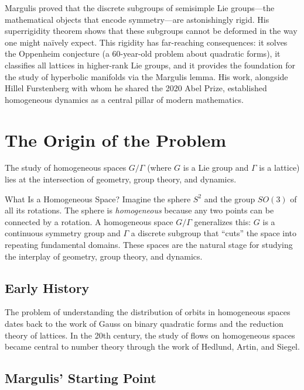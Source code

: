 Margulis proved that the discrete subgroups of semisimple Lie groups---the mathematical objects that encode symmetry---are astonishingly rigid. His superrigidity theorem shows that these subgroups cannot be deformed in the way one might na\"ively expect. This rigidity has far-reaching consequences: it solves the Oppenheim conjecture (a 60-year-old problem about quadratic forms), it classifies all lattices in higher-rank Lie groups, and it provides the foundation for the study of hyperbolic manifolds via the Margulis lemma. His work, alongside Hillel Furstenberg with whom he shared the 2020 Abel Prize, established homogeneous dynamics as a central pillar of modern mathematics.

\section{The Origin of the Problem}

The study of homogeneous spaces $G/\Gamma$ (where $G$ is a Lie group and $\Gamma$ is a lattice) lies at the intersection of geometry, group theory, and dynamics.

\begin{knowledgebridge}{What Is a Homogeneous Space?}
Imagine the sphere $S^2$ and the group $SO(3)$ of all its rotations. The sphere is \emph{homogeneous} because any two points can be connected by a rotation. A homogeneous space $G/\Gamma$ generalizes this: $G$ is a continuous symmetry group and $\Gamma$ a discrete subgroup that ``cuts'' the space into repeating fundamental domains. These spaces are the natural stage for studying the interplay of geometry, group theory, and dynamics.
\end{knowledgebridge}

\subsection{Early History}

The problem of understanding the distribution of orbits in homogeneous spaces dates back to the work of Gauss on binary quadratic forms and the reduction theory of lattices. In the 20th century, the study of flows on homogeneous spaces became central to number theory through the work of Hedlund, Artin, and Siegel.

\subsection{Margulis' Starting Point}

